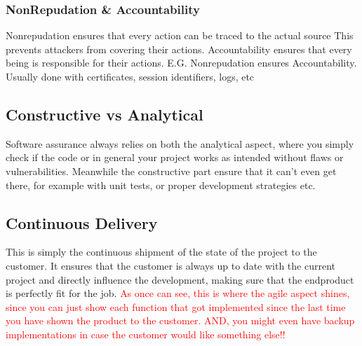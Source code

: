 \documentclass[main.tex,fontsize=12pt,paper=a4,paper=landscape,DIV=calc,]{scrartcl}
\begin{document}
\begin{multicols*}{2}
\subsubsection{NonRepudation \& Accountability}
Nonrepudation ensures that every action can be traced to the actual source\newline
This prevents attackers from covering their actions.\newline
Accountability ensures that every being is responsible for their actions.\newline
E.G. Nonrepudation ensures Accountability.\newline
Usually done with certificates, session identifiers, logs, etc

\subsection{Constructive vs Analytical}
Software assurance always relies on both the analytical aspect, where you simply check if the code or in general your project works as intended without flaws or vulnerabilities. \newline
Meanwhile the constructive part ensure that it can't even get there, for example with unit tests, or proper development strategies etc. 

\subsection{Continuous Delivery}
This is simply the continuous shipment of the state of the project to the customer. \newline
It ensures that the customer is always up to date with the current project and directly influence the development, making sure that the endproduct is perfectly fit for the job.\newline
\textcolor{red}{As once can see, this is where the agile aspect shines, since you can just show each function that got implemented since the last time you have shown the product to the customer.\newline
AND, you might even have backup implementations in case the customer would like something else!!}


\end{multicols*}
\end{document}
